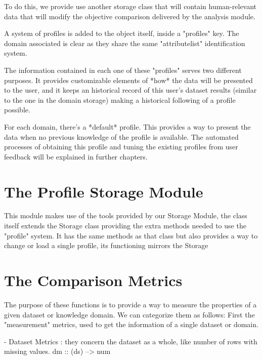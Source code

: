 To do this, we provide use another storage class that will contain human-relevant data that will modify the objective comparison delivered by the analysis module.

A system of profiles is added to the object itself, inside a "profiles" key. The domain associated is clear as they share the same "attributelist" identification system.

The information contained in each one of these "profiles" serves two different purposes. It provides customizable elements of *how* the data will be presented to the user, and it keeps an historical record of this user's dataset results (similar to the one in the domain storage) making a historical following of a profile possible.

For each domain, there's a *default* profile. This provides a way to present the data when no previous knowledge of the profile is available. The automated processes of obtaining this profile and tuning the existing profiles from user feedback will be explained in further chapters.


\section{The Profile Storage Module}
\label{cap2:sec:profilestorage}

This module makes use of the tools provided by our Storage Module, the class itself extends the Storage class providing the extra methods needed to use the "profile" system.
It has the same methods as that class but also provides a way to change or load a single profile, its functioning mirrors the Storage

\section{The Comparison Metrics}
\label{cap2:sec:metrics}

The purpose of these functions is to provide a way to measure the properties of a given dataset or knowledge domain.
We can categorize them as follows:
First the "measurement" metrics, used to get the information of a single dataset or domain.

    - Dataset Metrics : they concern the dataset as a whole, like number of rows with missing values.
        dm :: (ds) --> num
        
